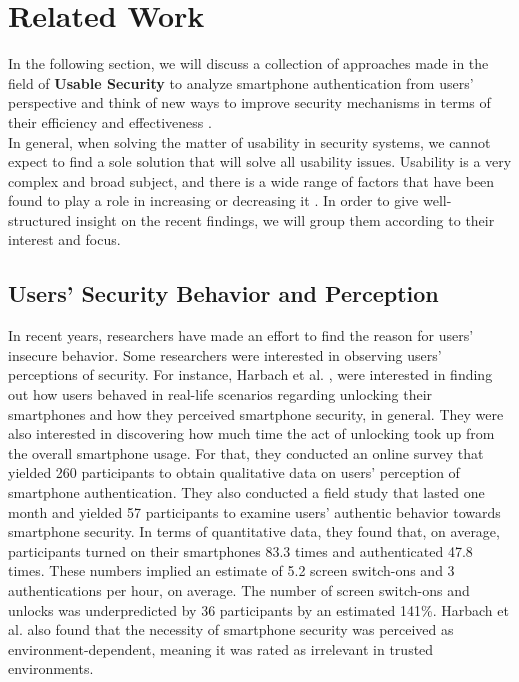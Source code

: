 \section{Related Work}

In the following section, we will discuss a collection of approaches made in the field of \textbf{Usable Security} to analyze smartphone authentication from users' perspective and think of new ways to improve security mechanisms in terms of their efficiency and effectiveness \cite{anonymous}. \\

In general, when solving the matter of usability in security systems, we cannot expect to find a sole solution that will solve all usability issues. Usability is a very complex and broad subject, and there is a wide range of factors that have been found to play a role in increasing or decreasing it \cite{anonymous,harbach,Albayram:2017:BUL:3235924.3235929, AnatomySmartphone}. In order to give well-structured insight on the recent findings, we will group them according to their interest and focus.

\subsection{Users' Security Behavior and Perception} \label{2.2.1}

In recent years, researchers have made an effort to find the reason for users' insecure behavior. Some researchers were interested in observing users' perceptions of security. For instance, Harbach et al. \cite{harbach}, were interested in finding out how users behaved in real-life scenarios regarding unlocking their smartphones and how they perceived smartphone security, in general. They were also interested in discovering how much time the act of unlocking took up from the overall smartphone usage. For that, they conducted an online survey that yielded 260 participants to obtain qualitative data on users' perception of smartphone authentication. They also conducted a field study that lasted one month and yielded 57 participants to examine users' authentic behavior towards smartphone security. In terms of quantitative data, they found that, on average, participants turned on their smartphones 83.3 times and authenticated 47.8 times. These numbers implied an estimate of 5.2 screen switch-ons and 3 authentications per hour, on average. The number of screen switch-ons and unlocks was underpredicted by 36 participants by an estimated 141\%. Harbach et al. \cite{harbach} also found that the necessity of smartphone security was perceived as environment-dependent, meaning it was rated as irrelevant in trusted environments.\\

